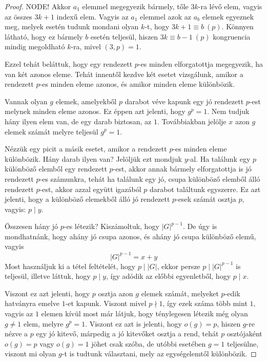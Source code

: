 \documentclass[12pt]{book}
\theoremstyle{plain} %
\theoremstyle{definition} %
\theoremstyle{remark}
\numberwithin{equation}{section}  %
\begin{document}
\begin{proof}
		NODE! Akkor $a_1$ elemmel megegyezik bármely, tőle $3k$-ra lévő elem, vagyis az összes $3k+1$ indexű elem. Vagyis az $a_1$ elemmel azok az $a_b$ elemek egyeznek meg, melyek esetén tudunk mondani olyan $k$-t, hogy $3k+1 \equiv b\ (p)$. Könnyen látható, hogy ez bármely $b$ esetén teljesül, hiszen $3k\equiv b-1\ (p)$ kongruencia mindig megoldható $k$-ra, mivel $(3,p) = 1$.
		
		Ezzel tehát beláttuk, hogy egy rendezett $p$-es minden elforgatottja megegyezik, ha van két azonos eleme. Tehát innentől kezdve két esetet vizsgálunk, amikor a rendezett $p$-es minden eleme azonos, és amikor minden eleme különbözik.
		
		Vannak olyan $g$ elemek, amelyekből $p$ darabot véve kapunk egy jó rendezett $p$-est melynek minden eleme azonos. Ez éppen azt jelenti, hogy $g^p = 1$. Nem tudjuk hány ilyen elem van, de egy darab biztosan, az $1$. Továbbiakban jelölje $x$ azon $g$ elemek számát melyre teljesül $g^p=1$.
		
		Nézzük egy picit a másik esetet, amikor a rendezett $p$-es minden eleme különbözik. Hány darab ilyen van? Jelöljük ezt mondjuk $y$-al. Ha találunk egy $p$ különböző elemből egy rendezett $p$-est, akkor annak bármely elforgatottja is jó rendezett $p$-es számunkra, tehát ha találunk egy jó, csupa különböző elemből álló rendezett $p$-est, akkor azzal együtt igazából $p$ darabot találtunk egyszerre. Ez azt jelenti, hogy a különböző elemekből álló jó rendezett $p$-esek számát osztja $p$, vagyis: $p\mid y$.
		
		Összesen hány jó $p$-es létezik? Kiszámoltuk, hogy $|G|^{p-1}$. De úgy is mondhatnánk, hogy ahány jó csupa azonos, és ahány jó csupa különböző elemű, vagyis
		\[ |G|^{p-1} = x + y  \]
		Most használjuk ki a tétel feltételét, hogy $p\mid |G|$, ekkor persze $p\mid |G|^{p-1}$ is teljesül, illetve láttuk, hogy $p\mid y$, így adódik az előbbi egyenletből, hogy $p\mid x$.
		
		Viszont ez azt jelenti, hogy $p$ osztja azon $g$ elemek számát, melyeket $p$-edik hatványra emelve $1$-et kapunk. Viszont mivel $p\nmid 1$, így ezek száma több mint $1$, vagyis az $1$ elemen kívül most már látjuk, hogy ténylegesen létezik még olyan $g\neq 1$ elem, melyre $g^p=1$. Viszont ez azt is jelenti, hogy $o(g) = p$, hiszen $g$-re nézve a $p$ egy jó kitevő, márpedig a jó kitevőket osztja a rend, tehát $p$ osztójaként $o(g) = p$ vagy $o(g) = 1$ jöhet csak szóba, de utóbbi esetében $g = 1$ teljesülne, viszont mi olyan $g$-t is tudtunk választani, mely az egységelemtől különbözik.
	\end{proof}
\end{document}
